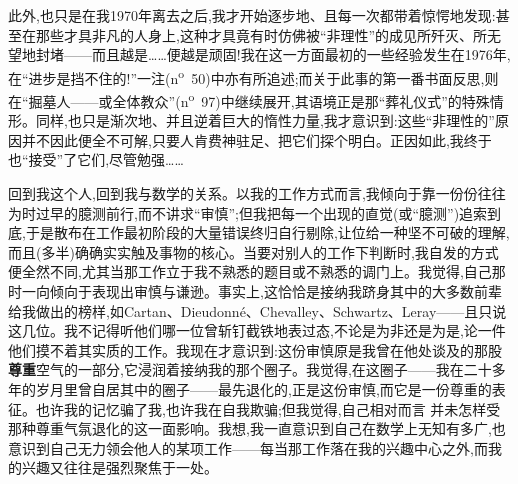 \noindent 此外,也只是在我1970年离去之后,我才开始逐步地、且每一次都带着惊愕地发现:甚至在那些才具非凡的人身上,这种才具竟有时仿佛被“非理性”的成见所歼灭、所无望地封堵——而且越是……便越是顽固!我在这一方面最初的一些经验发生在1976年,在“进步是挡不住的!”一注(n\textsuperscript{o}~50)中亦有所追述;而关于此事的第一番书面反思,则在“掘墓人——或全体教众”(n\textsuperscript{o}~97)中继续展开,其语境正是那\dmark{}“葬礼仪式”的特殊情形。同样,也只是渐次地、并且逆着巨大的惰性力量,我才意识到:这些“非理性的”原因并不因此便全不可解,只要人肯费神驻足、把它们探个明白。正因如此,我终于也“接受”了它们,尽管勉强……

回到我这个人,回到我与数学的关系。以我的工作方式而言,我倾向于靠一份份往往为时过早的臆测前行,而不讲求“审慎”;但我把每一个出现的直觉(或“臆测”)追索到底,于是散布在工作最初阶段的大量错误终归自行剔除,让位给一种坚不可破的理解,而且(多半)确确实实触及事物的核心。当要对别人的工作下判断时,我自发的方式便全然不同,尤其当那工作立于我不熟悉的题目或不熟悉的调门上。我觉得,自己那时一向倾向于表现出审慎与谦逊。事实上,这恰恰是接纳我跻身其中的大多数前辈给我做出的榜样,如Cartan、Dieudonné、Chevalley、Schwartz、Leray——且只说这几位。我不记得听他们哪一位曾斩钉截铁地表过态,不论是为非还是为是,论一件他们摸不着其实质的工作。我现在才意识到:这份审慎原是我曾在他处谈及的那股\textbf{尊重}空气的一部分,它浸润着接纳我的那个圈子。我觉得,在这圈子——我在二十多年的岁月里曾自居其中的圈子——最先退化的,正是这份审慎,而它是一份尊重的表征。也许我的记忆骗了我,也许我在自我欺骗;但我觉得,自己相对而言
并未怎样受那种尊重气氛退化的这一面影响。我想,我一直意识到自己在数学上无知有多广,也意识到自己无力领会他人的某项工作——每当那工作落在我的兴趣中心之外,而我的兴趣又往往是强烈聚焦于一处。

